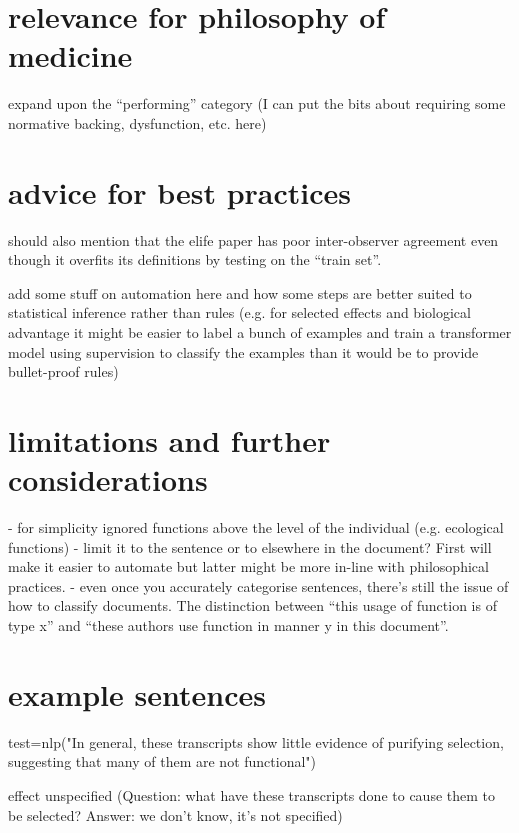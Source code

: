 \documentclass{article}
\begin{document}
\section{relevance for philosophy of medicine}
\label{sec:relev-phil-medic}

expand upon the ``performing'' category (I can put the bits about requiring some normative backing, dysfunction, etc. here)

\section{advice for best practices}
\label{sec:advice-best-pract}

should also mention that the elife paper has poor inter-observer agreement even though it overfits its definitions by testing on the ``train set''.

add some stuff on automation here and how some steps are better suited to statistical inference rather than rules (e.g. for selected effects and biological advantage it might be easier to label a bunch of examples and train a transformer model using supervision to classify the examples than it would be to provide bullet-proof rules)

\section{limitations and further considerations}
\label{sec:limitations}

- for simplicity ignored functions above the level of the individual (e.g. ecological functions)
- limit it to the sentence or to elsewhere in the document? First will make it easier to automate but latter might be more in-line with philosophical practices.
- even once you accurately categorise sentences, there's still the issue of how to classify documents. The distinction between ``this usage of function is of type x'' and ``these authors use function in manner y in this document''.

\section{example sentences}
\label{sec:example-sentences}

test=nlp("In general, these transcripts show little evidence of purifying selection, suggesting that many of them are not functional")

effect unspecified (Question: what have these transcripts done to cause them to be selected? Answer: we don't know, it's not specified)
\end{document}
